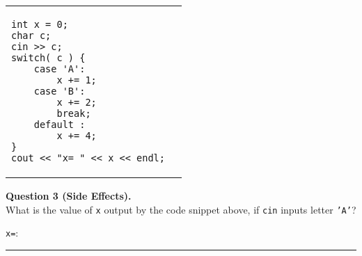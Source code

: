 \documentclass[11pt]{article}
\begin{document}
\vspace{5mm}
\begin{tabular}{@{}ll@{}} 
\begin{minipage}{0.38\columnwidth}
\begin{Verbatim}[frame=single]
int x = 0;
char c; 
cin >> c; 
switch( c ) {
    case 'A':
        x += 1;
    case 'B':
        x += 2;
        break;
    default :
        x += 4;
}
cout << "x= " << x << endl;
\end{Verbatim}



 

\end{minipage} &
\begin{minipage}{0.5\columnwidth}
\mbox{}

\end{minipage}
\end{tabular}


\vspace{20pt}
{\bf Question 3 (Side Effects).}\\
What is the value of {\tt x} output by the code snippet above, 
if {\tt cin} inputs letter {\tt 'A'}?

\vspace{10pt}
{\tt x=}: \rule{4cm}{0.4pt}


\newpage
\end{document}
